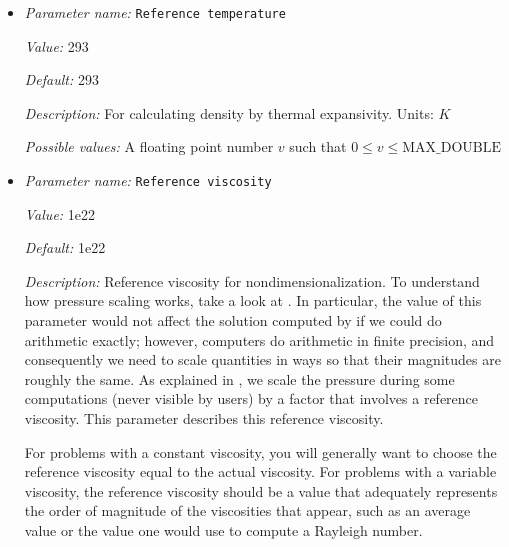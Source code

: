 \begin{itemize}
{\it Value:} 1.0e-15


{\it Default:} 1.0e-15


{\it Description:} Reference strain rate for first time step. Units: $1 / s$


{\it Possible values:} A floating point number $v$ such that $0 \leq v \leq \text{MAX\_DOUBLE}$
\item {\it Parameter name:} {\tt Reference temperature}
\label{parameters:Material model/Visco Plastic/Reference temperature}
\label{parameters:Material_20model/Visco_20Plastic/Reference_20temperature}


{\it Value:} 293


{\it Default:} 293


{\it Description:} For calculating density by thermal expansivity. Units: $K$


{\it Possible values:} A floating point number $v$ such that $0 \leq v \leq \text{MAX\_DOUBLE}$
\item {\it Parameter name:} {\tt Reference viscosity}
\label{parameters:Material model/Visco Plastic/Reference viscosity}
\label{parameters:Material_20model/Visco_20Plastic/Reference_20viscosity}


{\it Value:} 1e22


{\it Default:} 1e22


{\it Description:} Reference viscosity for nondimensionalization. To understand how pressure scaling works, take a look at \cite{KHB12}. In particular, the value of this parameter would not affect the solution computed by \aspect{} if we could do arithmetic exactly; however, computers do arithmetic in finite precision, and consequently we need to scale quantities in ways so that their magnitudes are roughly the same. As explained in \cite{KHB12}, we scale the pressure during some computations (never visible by users) by a factor that involves a reference viscosity. This parameter describes this reference viscosity.

For problems with a constant viscosity, you will generally want to choose the reference viscosity equal to the actual viscosity. For problems with a variable viscosity, the reference viscosity should be a value that adequately represents the order of magnitude of the viscosities that appear, such as an average value or the value one would use to compute a Rayleigh number.


\end{itemize}
